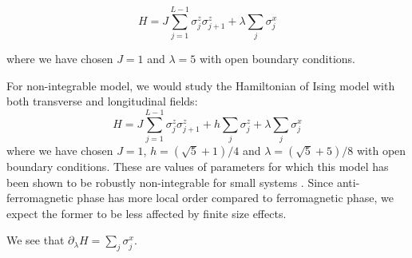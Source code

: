\documentclass[11pt,a4paper]{article}
\begin{document}
\begin{equation}
H= J \sum_{j=1}^{L-1} \sigma_j^z \sigma_{j+1}^z + \lambda \sum_{j} \sigma_j^x
\end{equation}


where we have chosen $J=1$ and $\lambda=5$ with open boundary conditions.

For non-integrable model, we would study the Hamiltonian of Ising model with both transverse and longitudinal fields:
\begin{equation}
H= J \sum_{j=1}^{L-1} \sigma_j^z \sigma_{j+1}^z + h\sum_{j} \sigma_j^z +\lambda \sum_{j} \sigma_j^x 
\end{equation}
%
where we have chosen $J=1$, $h= (\sqrt{5}+1)/4$ and $\lambda=(\sqrt{5}+5)/8$ with open boundary conditions. These are values of parameters for which this model has been shown to be robustly non-integrable for small systems \cite{kim2013ballistic}. Since anti-ferromagnetic phase has more local order compared to ferromagnetic phase, we expect the former to be less affected by finite size effects.

We see that $\partial_{\lambda}H =  \sum_{j} \sigma_j^x  $.
\end{document}
